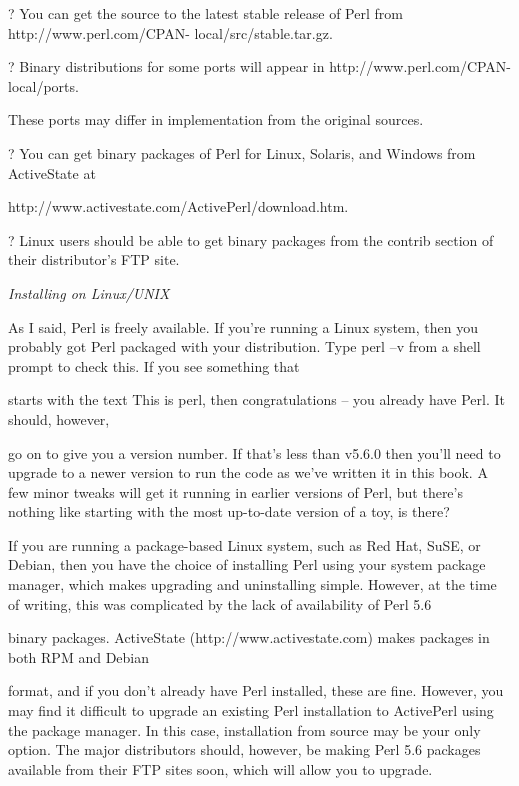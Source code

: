 \documentclass[a4paper,11pt]{book}
\begin{document}
\noindent 

\noindent ? You can get the source to the latest stable release of Perl from http://www.perl.com/CPAN- local/src/stable.tar.gz.

\noindent ? Binary distributions for some ports will appear in http://www.perl.com/CPAN-local/ports.

\noindent These ports may differ in implementation from the original sources.

\noindent 

\noindent ? You can get binary packages of Perl for Linux, Solaris, and Windows from ActiveState at

\noindent http://www.activestate.com/ActivePerl/download.htm.

\noindent 

\noindent ? Linux users should be able to get binary packages from the contrib section of their distributor's FTP site.

\noindent 

\noindent \textit{Installing on Linux/UNIX}

\noindent As I said, Perl is freely available. If you're running a Linux system, then you probably got Perl packaged with your distribution. Type perl --v from a shell prompt to check this. If you see something that

\noindent starts with the text This is perl, then congratulations -- you already have Perl. It should, however,

\noindent go on to give you a version number. If that's less than v5.6.0 then you'll need to upgrade to a newer version to run the code as we've written it in this book. A few minor tweaks will get it running in earlier versions of Perl, but there's nothing like starting with the most up-to-date version of a toy, is there?

\noindent 

\noindent If you are running a package-based Linux system, such as Red Hat, SuSE, or Debian, then you have the choice of installing Perl using your system package manager, which makes upgrading and uninstalling simple. However, at the time of writing, this was complicated by the lack of availability of Perl 5.6

\noindent binary packages. ActiveState (http://www.activestate.com) makes packages in both RPM and Debian

\noindent format, and if you don't already have Perl installed, these are fine. However, you may find it difficult to upgrade an existing Perl installation to ActivePerl using the package manager. In this case, installation from source may be your only option. The major distributors should, however, be making Perl 5.6 packages available from their FTP sites soon, which will allow you to upgrade.
\end{document}

